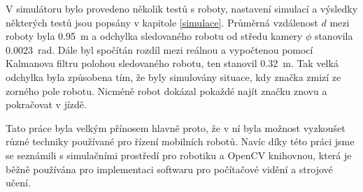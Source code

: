 \documentclass[twoside]{ctuthesis}
\theoremstyle{plain}
\theoremstyle{definition}
\theoremstyle{note}
\begin{document}
V simulátoru bylo provedeno několik testů s roboty, nastavení simulací a výsledky některých testů jsou popsány v kapitole \ref{simulace}. Průměrná vzdálenost $d$ mezi roboty byla \SI{0.95}{\meter} a odchylka sledovaného robotu od středu kamery $\phi$ stanovila \SI{0.0023}{\radian}. Dále byl spočítán rozdíl mezi reálnou a vypočtenou pomocí Kalmanova filtru polohou sledovaného robotu, ten stanovil \SI{0.32}{\meter}. Tak velká odchylka byla způsobena tím, že byly simulovány situace, kdy značka zmizí ze zorného pole robotu. Nicméně robot dokázal pokaždé najít značku znovu a pokračovat v jízdě. 	


Tato práce byla velkým přínosem hlavně proto, že v ní byla možnost vyzkoušet různé techniky používané pro řízení mobilních robotů. Navíc díky této práci jsme se seznámili s simulačními prostředí pro robotiku a OpenCV knihovnou, která je běžně používána pro implementaci softwaru pro počítačové vidění a strojové učení.


\appendix
\iffalse
\end{document}
